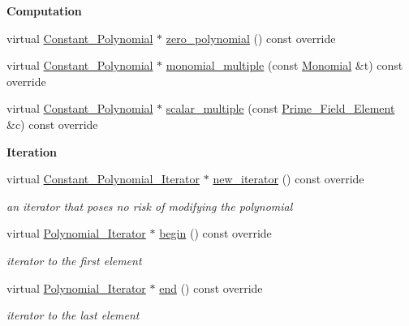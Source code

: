 \begin{Indent}\textbf{ Computation}\par
\begin{DoxyCompactItemize}
\item 
virtual \hyperlink{group__polygroup_class_constant___polynomial}{Constant\+\_\+\+Polynomial} $\ast$ \hyperlink{group__polygroup_af7933d269e23525f1f357c0e00bc71ea}{zero\+\_\+polynomial} () const override
\item 
virtual \hyperlink{group__polygroup_class_constant___polynomial}{Constant\+\_\+\+Polynomial} $\ast$ \hyperlink{group__polygroup_ae0af1a1cf7c7eed390b25a951a685da2}{monomial\+\_\+multiple} (const \hyperlink{group__polygroup_class_monomial}{Monomial} \&t) const override
\item 
virtual \hyperlink{group__polygroup_class_constant___polynomial}{Constant\+\_\+\+Polynomial} $\ast$ \hyperlink{group__polygroup_afd8bdd523c36fbde64df0bf36a0f4e77}{scalar\+\_\+multiple} (const \hyperlink{group___fields_group_class_prime___field___element}{Prime\+\_\+\+Field\+\_\+\+Element} \&c) const override
\end{DoxyCompactItemize}
\end{Indent}
\begin{Indent}\textbf{ Iteration}\par
\begin{DoxyCompactItemize}
\item 
\mbox{\label{group__polygroup_ab69dc9c6fcea390d0ab3c36379a3ee9c}} 
virtual \hyperlink{group___iterator_group_class_constant___polynomial___iterator}{Constant\+\_\+\+Polynomial\+\_\+\+Iterator} $\ast$ \hyperlink{group__polygroup_ab69dc9c6fcea390d0ab3c36379a3ee9c}{new\+\_\+iterator} () const override
\begin{DoxyCompactList}\small\item\em an iterator that poses no risk of modifying the polynomial \end{DoxyCompactList}\item 
\mbox{\label{group__polygroup_aaf17fe042545372d6ceb5858f3e3afac}} 
virtual \hyperlink{group___iterator_group_class_polynomial___iterator}{Polynomial\+\_\+\+Iterator} $\ast$ \hyperlink{group__polygroup_aaf17fe042545372d6ceb5858f3e3afac}{begin} () const override
\begin{DoxyCompactList}\small\item\em iterator to the first element \end{DoxyCompactList}\item 
\mbox{\label{group__polygroup_aee1e3c821a17fa655b02bab7d2bec2f2}} 
virtual \hyperlink{group___iterator_group_class_polynomial___iterator}{Polynomial\+\_\+\+Iterator} $\ast$ \hyperlink{group__polygroup_aee1e3c821a17fa655b02bab7d2bec2f2}{end} () const override
\begin{DoxyCompactList}\small\item\em iterator to the last element \end{DoxyCompactList}\end{DoxyCompactItemize}
\end{Indent}
